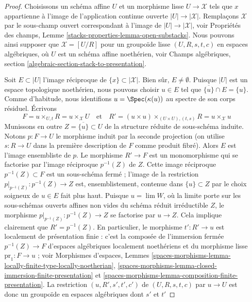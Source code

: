 \begin{proof}
Choisissons un schéma affine $U$ et un morphisme lisse
$U \to \mathcal{X}$ tels que $x$ appartienne à l'image de l'application
continue ouverte $|U| \to |\mathcal{X}|$. Remplaçons $\mathcal{X}$ par le
sous-champ ouvert correspondant à l'image de $|U| \to |\mathcal{X}|$, voir
Propriétés des champs, Lemme \ref{stacks-properties-lemma-open-substacks}.
Nous pouvons ainsi supposer que $\mathcal{X} = [U/R]$ pour un groupoïde lisse
$(U, R, s, t, c)$ en espaces algébriques, où $U$ est un schéma affine
noethérien, voir Champs algébriques, section
\ref{algebraic-section-stack-to-presentation}.

\medskip\noindent
Soit $E \subset |U|$ l'image réciproque de
$\{x\} \subset |\mathcal{X}|$. Bien sûr, $E \not = \emptyset$.
Puisque $|U|$ est un espace topologique noethérien, nous pouvons choisir
$u \in E$ tel que $\overline{\{u\}} \cap E = \{u\}$.
Comme d'habitude, nous identifions $u = \Spec(\kappa(u))$ au spectre de son
corps résiduel. Écrivons
$$
F = u \times_{U, t} R = u \times_\mathcal{X} U
\quad\text{et}\quad
R' = (u \times u) \times_{(U \times U), (t, s)} R = u \times_\mathcal{X} u
$$
Munissons en outre $Z = \overline{\{u\}} \subset U$ de la structure réduite
de sous-schéma induite. Notons $p : F \to U$ le morphisme induit par la
seconde projection (on utilise $s : R \to U$ dans la première description
de $F$ comme produit fibré). Alors $E$ est l'image ensembliste de $p$.
Le morphisme $R' \to F$ est un monomorphisme qui se factorise par l'image
réciproque $p^{-1}(Z)$ de $Z$. Cette image réciproque
$p^{-1}(Z) \subset F$ est un sous-schéma fermé ; l'image de la restriction
$p|_{p^{-1}(Z)} : p^{-1}(Z) \to Z$ est, ensemblistement, contenue dans
$\{u\} \subset Z$ par le choix soigneux de $u \in E$ fait plus haut.
Puisque $u = \lim W$, où la limite porte sur les
sous-schémas ouverts affines non vides du schéma réduit irréductible $Z$,
le morphisme $p|_{p^{-1}(Z)} : p^{-1}(Z) \to Z$ se factorise par
$u \to Z$. Cela implique clairement que $R' = p^{-1}(Z)$. En particulier,
le morphisme $t' : R' \to u$ est localement de présentation finie : c'est la
composée de l'immersion fermée $p^{-1}(Z) \to F$ d'espaces algébriques
localement noethériens et du morphisme lisse $\text{pr}_1 : F \to u$ ; voir
Morphismes d'espaces, Lemmes
\ref{spaces-morphisms-lemma-locally-finite-type-locally-noetherian},
\ref{spaces-morphisms-lemma-closed-immersion-finite-presentation} et
\ref{spaces-morphisms-lemma-composition-finite-presentation}.
La restriction $(u, R', s', t', c')$ de $(U, R, s, t, c)$ par
$u \to U$ est donc un groupoïde en espaces algébriques dont $s'$ et $t'$

\end{proof}
